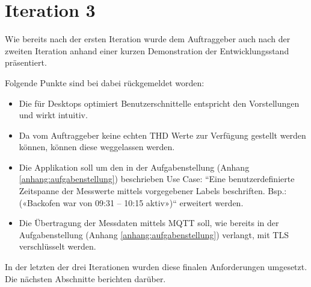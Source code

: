 \section{Iteration 3}
Wie bereits nach der ersten Iteration wurde dem Auftraggeber auch nach der zweiten Iteration
anhand einer kurzen Demonstration der Entwicklungsstand präsentiert.

Folgende Punkte sind bei dabei rückgemeldet worden:
\begin{itemize}
    \item Die für Desktops optimiert Benutzerschnittelle entspricht den Vorstellungen und wirkt intuitiv.
    \item Da vom Auftraggeber keine echten \ac{THD} Werte zur Verfügung gestellt werden können,
          können diese weggelassen werden.
    \item Die Applikation soll um den in der Aufgabenstellung (Anhang \ref{anhang:aufgabenstellung}) beschrieben Use Case:
          ``Eine benutzerdefinierte Zeitspanne der Messwerte mittels vorgegebener
          Labels beschriften. Bsp.: («Backofen war von 09:31 – 10:15 aktiv»)`` erweitert werden.
    \item Die Übertragung der Messdaten mittels \ac{MQTT} soll,
          wie bereits in der Aufgabenstellung (Anhang \ref{anhang:aufgabenstellung}) verlangt, mit \ac{TLS} verschlüsselt werden.
\end{itemize}
In der letzten der drei Iterationen wurden diese finalen Anforderungen umgesetzt.
Die nächsten Abschnitte berichten darüber.


